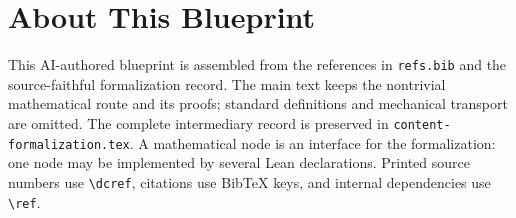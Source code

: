

\chapter*{About This Blueprint}

This AI-authored blueprint is assembled from the references in \texttt{refs.bib}
and the source-faithful formalization record.  The main text keeps the
nontrivial mathematical route and its proofs; standard definitions and
mechanical transport are omitted.  The complete intermediary record is
preserved in \texttt{content-formalization.tex}.  A mathematical node is an
interface for the formalization: one node may be implemented by several Lean
declarations.  Printed source numbers use \texttt{\textbackslash dcref},
citations use BibTeX keys, and internal dependencies use
\texttt{\textbackslash ref}.










\appendix

